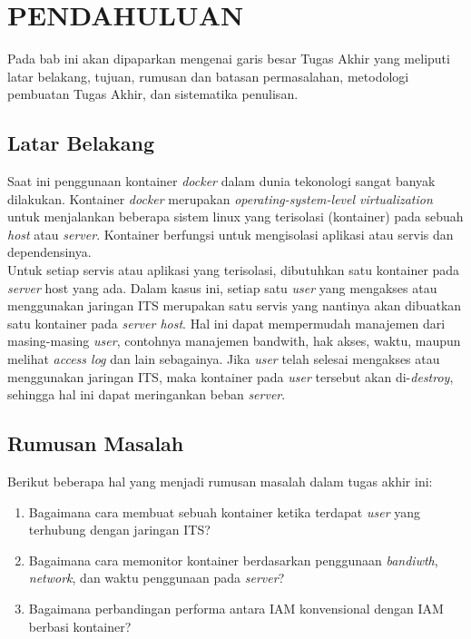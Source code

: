 \chapter{PENDAHULUAN}
  Pada bab ini akan dipaparkan mengenai garis besar Tugas Akhir yang meliputi latar belakang, tujuan, rumusan dan batasan permasalahan, metodologi pembuatan Tugas Akhir, dan sistematika penulisan.
  
  \section{Latar Belakang}
    Saat ini penggunaan kontainer \textit{docker} dalam dunia tekonologi sangat banyak dilakukan. Kontainer \textit{docker} merupakan \textit{operating-system-level virtualization} untuk menjalankan beberapa sistem linux yang terisolasi (kontainer) pada sebuah \textit{host} atau \textit{server}. Kontainer berfungsi untuk mengisolasi aplikasi atau servis dan dependensinya.\\
	\indent Untuk setiap servis atau aplikasi yang terisolasi, dibutuhkan satu kontainer pada \textit{server} host yang ada. Dalam kasus ini, setiap satu \textit{user} yang mengakses atau menggunakan jaringan ITS merupakan satu servis yang nantinya akan dibuatkan satu kontainer pada \textit{server host}. Hal ini dapat mempermudah manajemen dari masing-masing \textit{user}, contohnya manajemen bandwith, hak akses, waktu, maupun melihat \textit{access log} dan lain sebagainya. Jika \textit{user} telah selesai mengakses atau menggunakan jaringan ITS, maka kontainer pada \textit{user} tersebut akan di-\textit{destroy}, sehingga hal ini dapat meringankan beban \textit{server}.

\section{Rumusan Masalah}
	Berikut beberapa hal yang menjadi rumusan masalah dalam tugas akhir ini:
	\begin{enumerate}
	 \item Bagaimana cara membuat sebuah kontainer ketika terdapat \textit{user} yang terhubung dengan jaringan ITS?
	 \item Bagaimana cara memonitor kontainer berdasarkan penggunaan \textit{bandiwth}, \textit{network}, dan waktu penggunaan pada \textit{server}?
	 \item Bagaimana perbandingan performa antara IAM konvensional dengan IAM berbasi kontainer?
	\end{enumerate}


